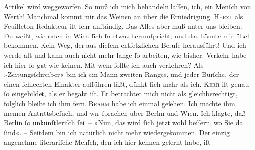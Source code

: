 \begin{ledgroupsized}[t]{13cm}
               Artikel wird weggeworfen.  So muß ich mich
               behandeln laſſen, ich, ein Menſch von Werth! Manchmal kommt mir das Weinen an über
               die Erniedrigung.\pend
           \pstart
           \textsc{Herzl} als Feuilleton-Redakteur
               iſt ſehr anſtändig. Das Alles aber muß unter uns bleiben. Du weißt, wie raſch in Wien ſich ſo etwas herumſpricht; und das könnte mir
               übel bekommen.\pend
           \pstart
           Kein Weg, der aus dieſem entſetzlichen Berufe herausführt! Und ich werde alt und kann
               auch nicht mehr lange ſo arbeiten, wie bisher.\pend
           \pstart
           Verkehr habe ich hier ſo gut wie keinen. {\pb}Mit wem
               ſollte ich auch verkehren? Als »Zeitungsſchreiber« bin ich ein Mann zweiten Ranges,
               und jeder Burſche, der einen ſchlechten Einakter aufführen läßt, dünkt ſich mehr als
               ich. \textsc{Kerr} iſt genau ſo eingebildet, als er begabt iſt. Er betrachtet mich nicht als
               gleichberechtigt, folglich bleibe ich ihm fern. \textsc{Brahm} habe ich einmal geſehen. Ich machte ihm meinen Antrittsbeſuch, und  wir ſprachen über Berlin und Wien. Ich klagte, daß Berlin ſo unkünſtleriſch ſei. – »Nun, das wird ſich jetzt wohl
               beſſern, wo Sie da ſind«. – Seitdem bin ich natürlich nicht mehr wiedergekommen. Der
               einzig angenehme literariſche Menſch, den ich hier kennen gelernt habe, iſt \label{K_L02907-7v}
\end{ledgroupsized}
